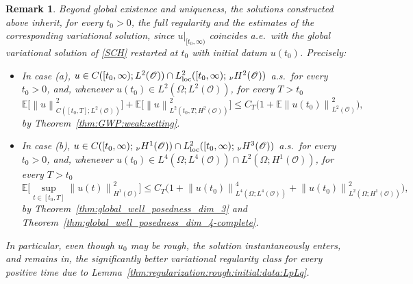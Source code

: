 \documentclass[reqno]{amsart}
\newtheorem{remark}[Satz]{Remark}
\newcommand{\E}{\mathbb{E}}
\newcommand{\sO}{\mathscr{O}}
\newcommand{\1}{\mathbf{1}}
\newcommand{\loc}{\textup{loc}}
\newcommand{\nH}{\ensuremath{\,_\nu H}}
\newcommand{\bpsn}[1]{\ensuremath{\nH^{#1}(\sO)}}
\newcommand{\nrm}[1]{\left\lVert #1 \right\rVert}
\begin{document}
\begin{remark}\label{rem:GWP:rough:additional:regularity}
        Beyond global existence and uniqueness, the solutions constructed above inherit, for every $t_0>0$, the full regularity and the estimates of the corresponding variational solution, since $u|_{[t_0,\infty)}$ coincides a.e.\ with the global variational solution of \eqref{SCH} restarted at $t_0$ with initial datum $u(t_0)$. Precisely:
        \begin{itemize}
            \item In case (a), $u\in C([t_0,\infty);L^2(\sO))\cap L^2_{\loc}([t_0,\infty);\bpsn{2})$ a.s.\ for every $t_0>0$, and, whenever $u(t_0)\in L^2(\Omega;L^2(\sO))$, for every $T>t_0$
            \[\E\big[\nrm{u}^2_{C([t_0,T];L^2(\sO))}\big]+\E\big[\nrm{u}^2_{L^2(t_0,T;H^2(\sO))}\big]\le C_T\big(1+\E\nrm{u(t_0)}^2_{L^2(\sO)}\big),\]
            by Theorem~\ref{thm:GWP:weak:setting}.
            \item In case (b), $u\in C([t_0,\infty);\bpsn{1})\cap L^2_{\loc}([t_0,\infty); \bpsn{3})$ a.s.\ for every $t_0>0$, and, whenever $u(t_0)\in L^4(\Omega;L^4(\sO))\cap L^2(\Omega;H^1(\sO))$, for every $T>t_0$
            \[\E\Big[\sup_{t\in[t_0,T]}\nrm{u(t)}^2_{H^1(\sO)}\Big]\le C_T\big(1+\nrm{u(t_0)}^4_{L^4(\Omega;L^4(\sO))}+\nrm{u(t_0)}^2_{L^2(\Omega;H^1(\sO))}\big),\]
            by Theorem~\ref{thm:global_well_posedness_dim_3} and Theorem~\ref{thm:global_well_posedness_dim_4-complete}.
        \end{itemize}
        In particular, even though $u_0$ may be rough, the solution instantaneously enters, and remains in, the significantly better variational regularity class for \emph{every} positive time due to Lemma~\ref{thm:regularization:rough:initial:data:LpLq}.
    \end{remark}


\printbibliography
\end{document}
